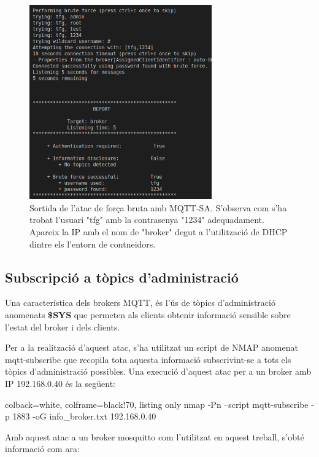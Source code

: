 \begin{figure}[H]
    \centering
    \includegraphics[width=0.7\textwidth]{img/mqttsa.png}
    \caption{Sortida de l'atac de força bruta amb MQTT-SA. S'observa com s'ha trobat l'usuari "tfg" amb la contrasenya "1234" adequadament. Apareix la IP amb el nom de "broker" degut a l'utilització de DHCP dintre els l'entorn de contneidors.}
    \label{fig:MqttsaBruteforce}
\end{figure}

\subsection{Subscripció a tòpics d'administració}

Una característica dels brokers MQTT, és l'ús de tòpics d'administració anomenats \textbf{\$SYS} que permeten als clients obtenir informació sensible sobre l'estat del broker i dels clients.

Per a la realització d'aquest atac, s'ha utilitzat un script de NMAP anomenat mqtt-subscribe que recopila tota aquesta informació subscrivint-se a tots els tòpics d'administració possibles. 
Una execució d'aquest atac per a un broker amb IP 192.168.0.40 és la següent:

\begin{tcblisting}{colback=white, colframe=black!70, listing only}
    nmap -Pn --script mqtt-subscribe -p 1883 -oG info_broker.txt 192.168.0.40
\end{tcblisting}

Amb aquest atac a un broker mosquitto com l'utilitzat en aquest treball, s'obté informació com ara:

